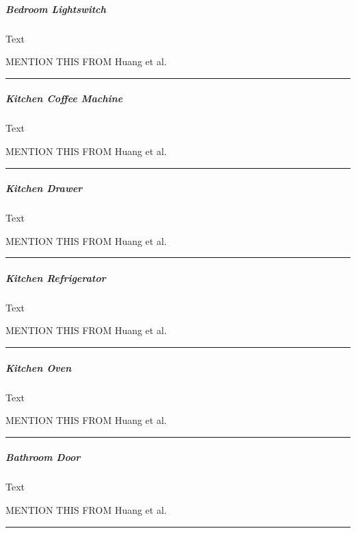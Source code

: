 \documentclass[11pt]{article}
\begin{document}
    \hypertarget{bedroom-lightswitch}{%
\subparagraph{Bedroom Lightswitch}\label{bedroom-lightswitch}}

    Text

    MENTION THIS FROM Huang et al.~

\begin{center}\rule{0.5\linewidth}{\linethickness}\end{center}

    \hypertarget{kitchen-coffee-machine}{%
\subparagraph{Kitchen Coffee Machine}\label{kitchen-coffee-machine}}

    Text

    MENTION THIS FROM Huang et al.~

\begin{center}\rule{0.5\linewidth}{\linethickness}\end{center}

    \hypertarget{kitchen-drawer}{%
\subparagraph{Kitchen Drawer}\label{kitchen-drawer}}

    Text

    MENTION THIS FROM Huang et al.~

\begin{center}\rule{0.5\linewidth}{\linethickness}\end{center}

    \hypertarget{kitchen-refrigerator}{%
\subparagraph{Kitchen Refrigerator}\label{kitchen-refrigerator}}

    Text

    MENTION THIS FROM Huang et al.~

\begin{center}\rule{0.5\linewidth}{\linethickness}\end{center}

    \hypertarget{kitchen-oven}{%
\subparagraph{Kitchen Oven}\label{kitchen-oven}}

    Text

    MENTION THIS FROM Huang et al.~

\begin{center}\rule{0.5\linewidth}{\linethickness}\end{center}

    \hypertarget{bathroom-door}{%
\subparagraph{Bathroom Door}\label{bathroom-door}}

    Text

    MENTION THIS FROM Huang et al.~

\begin{center}\rule{0.5\linewidth}{\linethickness}\end{center}
\end{document}
